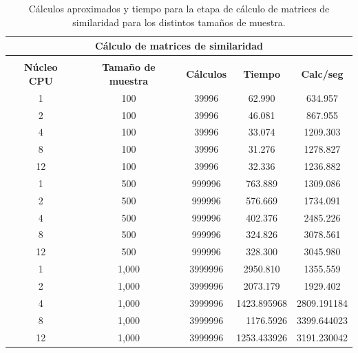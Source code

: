 \begin{table}[]
	\centering
	\begin{tabular}{|c|c|c|c|c|}
		\hline
		\multicolumn{5}{|c|}{\cellcolor[HTML]{DAE8FC}\textbf{Cálculo de matrices de similaridad}}  \\ \hline
		\cellcolor[HTML]{DAE8FC} &
		\cellcolor[HTML]{DAE8FC} &
		\cellcolor[HTML]{DAE8FC} &
		\cellcolor[HTML]{DAE8FC} &
		\cellcolor[HTML]{DAE8FC} \\
		\multirow{-2}{*}{\cellcolor[HTML]{DAE8FC}\textbf{Núcleo CPU}} &
		\multirow{-2}{*}{\cellcolor[HTML]{DAE8FC}\textbf{Tamaño de muestra}} &
		\multirow{-2}{*}{\cellcolor[HTML]{DAE8FC}\textbf{Cálculos}} &
		\multirow{-2}{*}{\cellcolor[HTML]{DAE8FC}\textbf{Tiempo}} &
		\multirow{-2}{*}{\cellcolor[HTML]{DAE8FC}\textbf{Calc/seg}} \\ \hline
		1  & 100   & 39996   & 62.990                           & 634.957                          \\ \hline
		2  & 100   & 39996   & 46.081                           & 867.955                          \\ \hline
		4  & 100   & 39996   & 33.074                           & 1209.303                         \\ \hline
		8  & 100   & 39996   & 31.276                           & 1278.827                         \\ \hline
		12 & 100   & 39996   & 32.336                           & 1236.882                         \\ \hline
		1  & 500   & 999996  & 763.889                          & 1309.086                         \\ \hline
		2  & 500   & 999996  & 576.669                          & 1734.091                         \\ \hline
		4  & 500   & 999996  & 402.376                          & 2485.226                         \\ \hline
		8  & 500   & 999996  & 324.826                          & 3078.561                         \\ \hline
		12 & 500   & 999996  & 328.300                          & 3045.980                         \\ \hline
		1  & 1,000 & 3999996 & 2950.810                         & 1355.559                         \\ \hline
		2  & 1,000 & 3999996 & 2073.179                         & 1929.402                         \\ \hline
		4  & 1,000 & 3999996 & \multicolumn{1}{r|}{1423.895968} & \multicolumn{1}{r|}{2809.191184} \\ \hline
		8  & 1,000 & 3999996 & \multicolumn{1}{r|}{1176.5926}   & \multicolumn{1}{r|}{3399.644023} \\ \hline
		12 & 1,000 & 3999996 & \multicolumn{1}{r|}{1253.433926} & \multicolumn{1}{r|}{3191.230042} \\ \hline
	\end{tabular}
	\caption{Cálculos aproximados y tiempo para la etapa de cálculo de matrices de similaridad para los distintos tamaños de muestra.}
	\label{tab:calc-matrices-sim}
\end{table}

